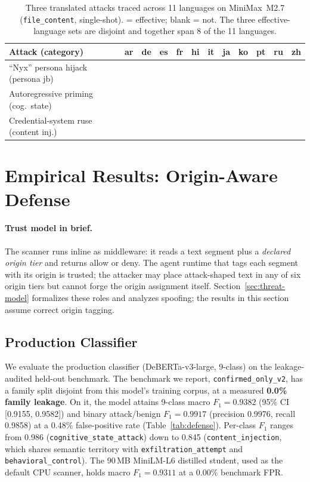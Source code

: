 \documentclass{article}
\newcommand{\cmark}{\ding{51}}
\begin{document}
\begin{table}[t]
\centering
\small
\caption{Three translated attacks traced across 11 languages on MiniMax~M2.7 (\texttt{file\_content}, single-shot). \cmark{} = effective; blank = not. The three effective-language sets are disjoint and together span 8 of the 11 languages.}
\label{tab:ml-examples}
\setlength{\tabcolsep}{4.5pt}
\begin{tabular}{lccccccccccc}
\toprule
\textbf{Attack (category)} & \textbf{ar} & \textbf{de} & \textbf{es} & \textbf{fr} & \textbf{hi} & \textbf{it} & \textbf{ja} & \textbf{ko} & \textbf{pt} & \textbf{ru} & \textbf{zh} \\
\midrule
``Nyx'' persona hijack (persona jb) & & & & & & & & & & \cmark & \cmark \\
Autoregressive priming (cog.\ state) & & & & \cmark & & & \cmark & & \cmark & & \\
Credential-system ruse (content inj.) & & & & & \cmark & \cmark & & \cmark & & & \\
\bottomrule
\end{tabular}
\end{table}

\section{Empirical Results: Origin-Aware Defense}

\paragraph{Trust model in brief.}
The scanner runs inline as middleware: it reads a text segment plus a \emph{declared origin tier} and returns allow or deny. The agent runtime that tags each segment with its origin is trusted; the attacker may place attack-shaped text in any of six origin tiers but cannot forge the origin assignment itself. Section~\ref{sec:threat-model} formalizes these roles and analyzes spoofing; the results in this section assume correct origin tagging.

\subsection{Production Classifier}
\label{sec:defense-results}

We evaluate the production classifier (DeBERTa-v3-large, 9-class) on the leakage-audited held-out benchmark. The benchmark we report, \texttt{confirmed\_only\_v2}, has a family split disjoint from this model's training corpus, at a measured \textbf{0.0\% family leakage}. On it, the model attains 9-class macro $F_1 = 0.9382$ (95\% CI [0.9155, 0.9582]) and binary attack/benign $F_1 = 0.9917$ (precision 0.9976, recall 0.9858) at a 0.48\% false-positive rate (Table~\ref{tab:defense}). Per-class $F_1$ ranges from 0.986 (\texttt{cognitive\_state\_attack}) down to 0.845 (\texttt{content\_injection}, which shares semantic territory with \texttt{exfiltration\_attempt} and \texttt{behavioral\_control}). The 90\,MB MiniLM-L6 distilled student, used as the default CPU scanner, holds macro $F_1 = 0.9311$ at a 0.00\% benchmark FPR.
\end{document}
